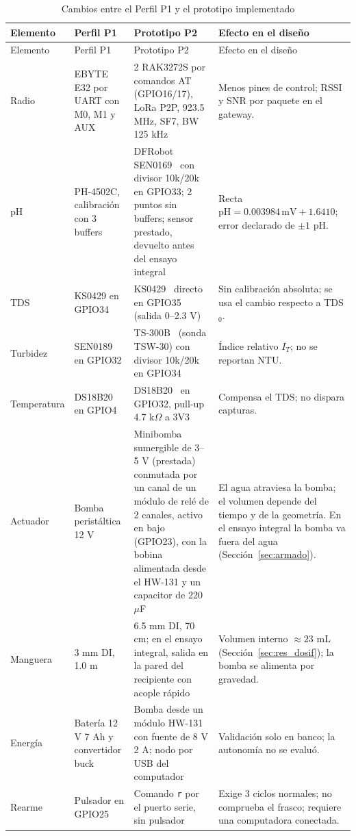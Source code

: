 {\small
\begin{longtable}{p{2.6cm}p{3.6cm}p{4.4cm}p{4.6cm}}
\caption{Cambios entre el Perfil P1 y el prototipo implementado}
\label{tab:cambios} \\
\toprule
Elemento & Perfil P1 & Prototipo P2 & Efecto en el diseño \\
\midrule
\endfirsthead
\toprule
Elemento & Perfil P1 & Prototipo P2 & Efecto en el diseño \\
\midrule
\endhead
Radio & EBYTE E32 por UART con M0, M1 y AUX & 2 RAK3272S por comandos AT (GPIO16/17), LoRa P2P, 923.5 MHz, SF7, BW 125 kHz & Menos pines de control; RSSI y SNR por paquete en el gateway. \\
pH & PH-4502C, calibración con 3 buffers & DFRobot SEN0169~\cite{ph_sen0169} con divisor 10k/20k en GPIO33; 2 puntos sin buffers; sensor prestado, devuelto antes del ensayo integral & Recta $\mathrm{pH}=0.003984\,\mathrm{mV}+1.6410$; error declarado de $\pm 1$ pH. \\
TDS & KS0429 en GPIO34 & KS0429~\cite{tds} directo en GPIO35 (salida 0--2.3 V) & Sin calibración absoluta; se usa el cambio respecto a TDS$_0$. \\
Turbidez & SEN0189~\cite{turb} en GPIO32 & TS-300B~\cite{ts300b} (sonda TSW-30) con divisor 10k/20k en GPIO34 & Índice relativo $I_T$; no se reportan NTU. \\
Temperatura & DS18B20 en GPIO4 & DS18B20~\cite{ds18} en GPIO32, pull-up 4.7 k$\Omega$ a 3V3 & Compensa el TDS; no dispara capturas. \\
Actuador & Bomba peristáltica 12 V & Minibomba sumergible de 3--5 V (prestada) conmutada por un canal de un módulo de relé de 2 canales, activo en bajo (GPIO23), con la bobina alimentada desde el HW-131 y un capacitor de 220~$\mu$F & El agua atraviesa la bomba; el volumen depende del tiempo y de la geometría. En el ensayo integral la bomba va fuera del agua (Sección~\ref{sec:armado}). \\
Manguera & 3 mm DI, 1.0 m & 6.5 mm DI, 70 cm; en el ensayo integral, salida en la pared del recipiente con acople rápido & Volumen interno $\approx 23$ mL (Sección~\ref{sec:res_dosif}); la bomba se alimenta por gravedad. \\
Energía & Batería 12 V 7 Ah y convertidor buck & Bomba desde un módulo HW-131 con fuente de 8 V 2 A; nodo por USB del computador & Validación solo en banco; la autonomía no se evaluó. \\
Rearme & Pulsador en GPIO25 & Comando \texttt{r} por el puerto serie, sin pulsador & Exige 3 ciclos normales; no comprueba el frasco; requiere una computadora conectada. \\

\end{longtable}}
